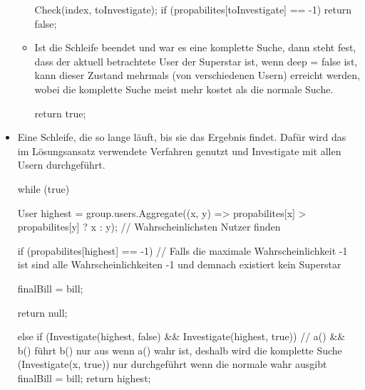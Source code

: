 \documentclass{article}
\begin{document}
\begin{flushleft}
\begin{itemize}
\begin{itemize}
\begin{Csharp}
Check(index, toInvestigate);
if (propabilites[toInvestigate] == -1) return false;
\end{Csharp}
		\item Ist die Schleife beendet und war es eine komplette Suche, dann steht fest, dass der aktuell betrachtete User der Superstar ist, wenn deep = false ist, kann dieser Zustand mehrmals (von verschiedenen Usern) erreicht werden, wobei die komplette Suche meist mehr kostet als die normale Suche.
\begin{Csharp}
return true;
\end{Csharp}
	\end{itemize}
	\item Eine Schleife, die so lange läuft, bis sie das Ergebnis findet. Dafür wird das im Lösungsansatz verwendete Verfahren genutzt und Investigate mit allen Usern durchgeführt.
\begin{Csharp}
while (true)                                                                                 
{                                                                                            
    User highest = group.users.Aggregate((x, y) => propabilites[x] > propabilites[y] ? x : y);
    	// Wahrscheinlichsten Nutzer finden

    if (propabilites[highest] == -1)
    	// Falls die maximale Wahrscheinlichkeit -1 ist sind alle Wahrscheinlichkeiten -1 und demnach existiert kein Superstar
    {
        finalBill = bill;

        return null;
    }
    else
    {
        if (Investigate(highest, false) && Investigate(highest, true))
        	// a() && b() führt b() nur aus wenn a() wahr ist, deshalb wird die komplette Suche (Investigate(x, true)) nur durchgeführt wenn die normale wahr ausgibt
        {
            finalBill = bill;
            return highest;
        }
    }
}
\end{Csharp}
	
\end{itemize}
\end{flushleft}
\end{document}
